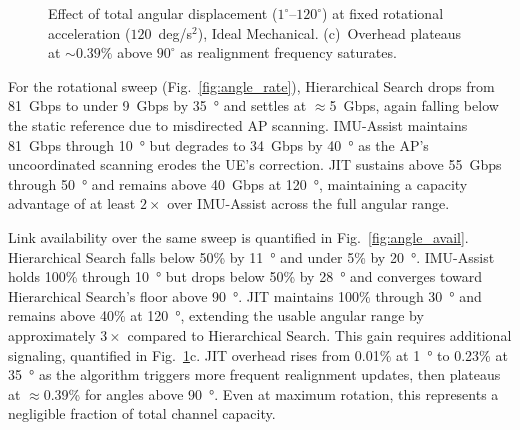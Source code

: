 \documentclass[fleqn,10pt]{wlscirep}
\newcommand{\legline}[2]{%
    \tikz[baseline=-0.5ex]{
        \draw[#1, #2, line width=1.5pt] (0,0) -- (0.5,0);
    }%
}
\begin{document}
\begin{figure}[ht!]
    \caption{Effect of total angular displacement ($1^\circ$--$120^\circ$) at fixed rotational acceleration ($120$~deg/s$^2$), Ideal Mechanical. (c)~Overhead plateaus at ${\sim}0.39\%$ above $90^\circ$ as realignment frequency saturates.}
    \label{fig:angle_effects}
    \vspace{-5pt}
\end{figure}

For the rotational sweep (Fig.~\ref{fig:angle_rate}), Hierarchical Search drops from \SI{81}{Gbps} to under \SI{9}{Gbps} by \SI{35}{\degree} and settles at $\approx$\SI{5}{Gbps}, again falling below the static reference due to misdirected AP scanning. IMU-Assist maintains \SI{81}{Gbps} through \SI{10}{\degree} but degrades to \SI{34}{Gbps} by \SI{40}{\degree} as the AP's uncoordinated scanning erodes the UE's correction. JIT sustains above \SI{55}{Gbps} through \SI{50}{\degree} and remains above \SI{40}{Gbps} at \SI{120}{\degree}, maintaining a capacity advantage of at least $2\times$ over IMU-Assist across the full angular range.

Link availability over the same sweep is quantified in Fig.~\ref{fig:angle_avail}. Hierarchical Search falls below 50\% by \SI{11}{\degree} and under 5\% by \SI{20}{\degree}. IMU-Assist holds 100\% through \SI{10}{\degree} but drops below 50\% by \SI{28}{\degree} and converges toward Hierarchical Search's floor above \SI{90}{\degree}. JIT maintains 100\% through \SI{30}{\degree} and remains above 40\% at \SI{120}{\degree}, extending the usable angular range by approximately $3\times$ compared to Hierarchical Search. This gain requires additional signaling, quantified in Fig.~\ref{fig:angle_effects}c. JIT overhead rises from 0.01\% at \SI{1}{\degree} to 0.23\% at \SI{35}{\degree} as the algorithm triggers more frequent realignment updates, then plateaus at $\approx$0.39\% for angles above \SI{90}{\degree}. Even at maximum rotation, this represents a negligible fraction of total channel capacity.
\end{document}
